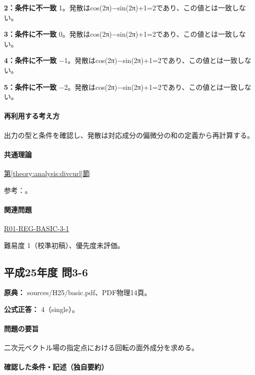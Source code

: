 \noindent\textbf{2：条件に不一致} 1。発散はcos(2π)−sin(2π)+1=\allowbreak{}2であり、この値とは一致しない。\par

\noindent\textbf{3：条件に不一致} 0。発散はcos(2π)−sin(2π)+1=\allowbreak{}2であり、この値とは一致しない。\par

\noindent\textbf{4：条件に不一致} −1。発散はcos(2π)−sin(2π)+1=\allowbreak{}2であり、この値とは一致しない。\par

\noindent\textbf{5：条件に不一致} −2。発散はcos(2π)−sin(2π)+1=\allowbreak{}2であり、この値とは一致しない。\par

\paragraph{再利用する考え方} 出力の型と条件を確認し、発散は対応成分の偏微分の和の定義から再計算する。

\paragraph{共通理論} \hyperref[theory:analysis:divcurl]{第\ref*{theory:analysis:divcurl}節}

\par 参考：\cite{mit_vectorcalc2005}。

\paragraph{関連問題} \hyperref[q:r01-reg-basic-3-1]{R01-REG-BASIC-3-1}

\par 難易度 1（校準初稿）、優先度未評価。

\subsection{平成25年度 問3-6}
\label{q:h25-reg-basic-3-6}

\noindent\textbf{原典：} sources/H25/basic.pdf、PDF物理14頁。

\textbf{公式正答：} 4（single）。

\paragraph{問題の要旨} 二次元ベクトル場の指定点における回転の面外成分を求める。

\paragraph{確認した条件・記述（独自要約）}\mbox{}\par

